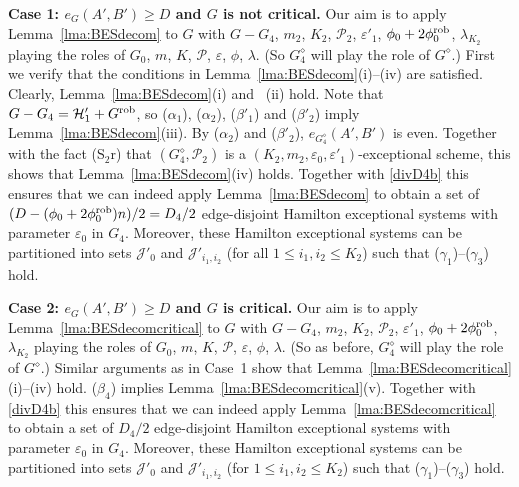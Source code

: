 \documentclass{memo-l}
\def\cP{\mathcal{P}}
\def\eps{\varepsilon}
\numberwithin{section}{chapter}
\numberwithin{equation}{section}
\numberwithin{firstthm}{section}
\numberwithin{figure}{section}
\begin{document}
{\noindent\textbf{Case 1: $e_G(A',B') \ge D$ and $G$ is not critical.}
Our aim is to apply Lemma~\ref{lma:BESdecom} to $G$ with $G - G_4$, $m_2$, $K_2$, $\cP_2$, $\eps'_1$, $\phi_0+2 \phi^{\rm rob}_0$, $ \lambda_{K_2}$
playing the roles of $G_0$, $m$, $K$, $\cP$, $\eps$, $\phi$, $\lambda$.
(So $G^{\diamond}_4$ will play the role of $G^{\diamond}$.) First we verify that the conditions in Lemma~\ref{lma:BESdecom}(i)--(iv) are satisfied. 
Clearly, Lemma~\ref{lma:BESdecom}(i) and ~(ii) hold.
Note that $G - G_4 = \mathcal{H}'_1 + G^{\rm rob}$, so ($\alpha_1$), ($\alpha_2$), ($\beta'_1$) and ($\beta'_2$) imply Lemma~\ref{lma:BESdecom}(iii).
By ($\alpha_2$) and ($\beta'_2$), $e_{G_4^{\diamond}}(A',B')$ is even. Together with the fact (S$_2$r) that
$(G^{\diamond}_4 , \cP_2)$ is a $(K_2, m_2, \eps_0, \eps'_1)$-exceptional scheme, this shows that Lemma~\ref{lma:BESdecom}(iv) holds.
Together with \eqref{divD4b} this ensures that we can indeed apply Lemma~\ref{lma:BESdecom} to obtain a set of
$(D- (\phi_0 + 2 \phi^{\rm rob}_0) n)/2 = D_4/2$ edge-disjoint Hamilton exceptional systems with parameter $\eps_0$ in $G_4$.
Moreover, these Hamilton exceptional systems can be partitioned into sets $\mathcal{J}'_0$ and
$\mathcal{J}'_{i_1,i_2}$ (for all $1 \le i_1, i_2  \le K_2$) such that ($\gamma_1$)--($\gamma_3$) hold.


\noindent\textbf{Case 2: $e_G(A',B') \ge D$ and $G$ is critical.}
Our aim is to apply Lemma~\ref{lma:BESdecomcritical} to $G$ with $G - G_4$, $m_2$, $K_2$, $\cP_2$, $\eps'_1$, $\phi_0+2 \phi^{\rm rob}_0$, $ \lambda_{K_2}$
playing the roles of $G_0$, $m$, $K$, $\cP$, $\eps$, $\phi$, $\lambda$.
(So as before, $G^{\diamond}_4$ will play the role of $G^{\diamond}$.) Similar arguments as in Case~1 show that
Lemma~\ref{lma:BESdecomcritical}(i)--(iv) hold. ($ \beta_4$) implies Lemma~\ref{lma:BESdecomcritical}(v).
Together with \eqref{divD4b} this ensures that we can indeed apply
Lemma~\ref{lma:BESdecomcritical} to obtain a set of $D_4/2$ edge-disjoint Hamilton exceptional
systems with parameter $\eps_0$ in $G_4$. Moreover, these Hamilton exceptional systems can be partitioned into sets $\mathcal{J}'_0$ and
$\mathcal{J}'_{i_1,i_2}$ (for $1 \le i_1, i_2  \le K_2$) such that ($\gamma_1$)--($\gamma_3$) hold.

}
\end{document}
